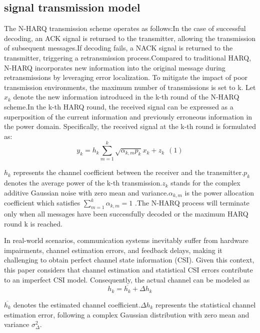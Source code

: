 \documentclass[runningheads]{llncs}
\begin{document}
\subsection{signal transmission model}
\par
The N-HARQ transmission scheme operates as follows:In the case of successful decoding, an ACK signal is returned to the transmitter, allowing the transmission of subsequent messages.If decoding fails, a NACK signal is returned to the transmitter, triggering a retransmission process.Compared to traditional HARQ, N-HARQ incorporates new information into the original message during retransmissions by leveraging error localization. To mitigate the impact of poor transmission environments, the maximum number of transmissions is set to k. Let $x_k$ denote the new information introduced in the k-th round of the N-HARQ scheme.In the k-th HARQ round, the received signal can be expressed as a superposition of the current information and previously erroneous information in the power domain. Specifically, the received signal at the k-th round is formulated as:
$$
y_k=h_k\sum_{m=1}^k{\sqrt{\alpha _{k,m}p_k}x_k+z_k}\ \ \left( 1 \right) 
$$
\par
$h_k$ represents the channel coefficient between the receiver and the transmitter.$p_k$ denotes the average power of the k-th transmission.$z_k$ stands for the complex additive Gaussian noise with zero mean and variance.$\alpha_{k,m}$ is the power allocation coefficient which satisfies $\sum_{m=1}^k{\alpha _{k,m}}=1$ .The N-HARQ process will terminate only when all messages have been successfully decoded or the maximum HARQ round k is reached.
\par
In real-world scenarios, communication systems inevitably suffer from hardware impairments, channel estimation errors, and feedback delays, making it challenging to obtain perfect channel state information (CSI). Given this context, this paper considers that channel estimation and statistical CSI errors contribute to an imperfect CSI model. Consequently, the actual channel can be modeled as
$$
h_k=\overline{h_k}+\Delta h_k
$$
\par
$\overline{h_k}$ denotes the estimated channel coefficient.$\Delta h_k$ represents the statistical channel estimation error, following a complex Gaussian distribution with zero mean and variance $\sigma _{\varDelta}^{2}$.
\end{document}
